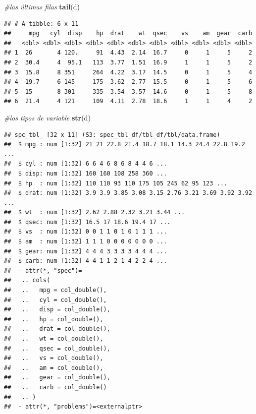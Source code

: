 \documentclass[
]{article}
\newenvironment{Shaded}{\begin{snugshade}}{\end{snugshade}}
\newcommand{\CommentTok}[1]{\textcolor[rgb]{0.56,0.35,0.01}{\textit{#1}}}
\newcommand{\FunctionTok}[1]{\textcolor[rgb]{0.13,0.29,0.53}{\textbf{#1}}}
\newcommand{\NormalTok}[1]{#1}
\begin{document}
\begin{Shaded}
\begin{Highlighting}[]
\CommentTok{\#las últimas filas}
\FunctionTok{tail}\NormalTok{(d)}
\end{Highlighting}
\end{Shaded}

\begin{verbatim}
## # A tibble: 6 x 11
##     mpg   cyl  disp    hp  drat    wt  qsec    vs    am  gear  carb
##   <dbl> <dbl> <dbl> <dbl> <dbl> <dbl> <dbl> <dbl> <dbl> <dbl> <dbl>
## 1  26       4 120.     91  4.43  2.14  16.7     0     1     5     2
## 2  30.4     4  95.1   113  3.77  1.51  16.9     1     1     5     2
## 3  15.8     8 351     264  4.22  3.17  14.5     0     1     5     4
## 4  19.7     6 145     175  3.62  2.77  15.5     0     1     5     6
## 5  15       8 301     335  3.54  3.57  14.6     0     1     5     8
## 6  21.4     4 121     109  4.11  2.78  18.6     1     1     4     2
\end{verbatim}

\begin{Shaded}
\begin{Highlighting}[]
\CommentTok{\#los tipos de variable}
\FunctionTok{str}\NormalTok{(d)}
\end{Highlighting}
\end{Shaded}

\begin{verbatim}
## spc_tbl_ [32 x 11] (S3: spec_tbl_df/tbl_df/tbl/data.frame)
##  $ mpg : num [1:32] 21 21 22.8 21.4 18.7 18.1 14.3 24.4 22.8 19.2 ...
##  $ cyl : num [1:32] 6 6 4 6 8 6 8 4 4 6 ...
##  $ disp: num [1:32] 160 160 108 258 360 ...
##  $ hp  : num [1:32] 110 110 93 110 175 105 245 62 95 123 ...
##  $ drat: num [1:32] 3.9 3.9 3.85 3.08 3.15 2.76 3.21 3.69 3.92 3.92 ...
##  $ wt  : num [1:32] 2.62 2.88 2.32 3.21 3.44 ...
##  $ qsec: num [1:32] 16.5 17 18.6 19.4 17 ...
##  $ vs  : num [1:32] 0 0 1 1 0 1 0 1 1 1 ...
##  $ am  : num [1:32] 1 1 1 0 0 0 0 0 0 0 ...
##  $ gear: num [1:32] 4 4 4 3 3 3 3 4 4 4 ...
##  $ carb: num [1:32] 4 4 1 1 2 1 4 2 2 4 ...
##  - attr(*, "spec")=
##   .. cols(
##   ..   mpg = col_double(),
##   ..   cyl = col_double(),
##   ..   disp = col_double(),
##   ..   hp = col_double(),
##   ..   drat = col_double(),
##   ..   wt = col_double(),
##   ..   qsec = col_double(),
##   ..   vs = col_double(),
##   ..   am = col_double(),
##   ..   gear = col_double(),
##   ..   carb = col_double()
##   .. )
##  - attr(*, "problems")=<externalptr>
\end{verbatim}
\end{document}
